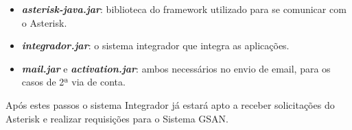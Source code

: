 \begin{itemize}
	\item \textbf{\textit{asterisk-java.jar}}: biblioteca do framework utilizado para se comunicar com o Asterisk.
	\item \textbf{\textit{integrador.jar}}: o sistema integrador que integra as aplicações.
	\item \textbf{\textit{mail.jar}} e \textbf{\textit{activation.jar}}: ambos necessários no envio de email, para os casos de 2ª via de conta.	
\end{itemize}

Após estes passos o sistema Integrador já estará apto a receber solicitações do Asterisk e realizar requisições para o Sistema GSAN.